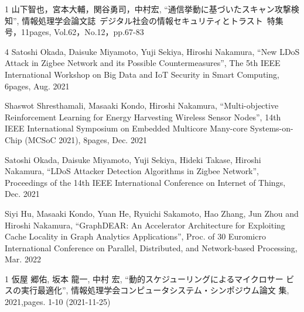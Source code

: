 \begin{雑誌論文}{1}
山下智也，宮本大輔，関谷勇司，中村宏, ``通信挙動に基づいたスキャン攻撃検
知'', 情報処理学会論文誌~デジタル社会の情報セキュリティとトラスト~特集
号，11pages, Vol.62，No.12，pp.67-83

\end{雑誌論文}

\begin{査読付}{4}
Satoshi Okada, Daisuke Miyamoto, Yuji Sekiya, Hiroshi Nakamura, ``New
LDoS Attack in Zigbee Network and its Possible Countermeasures'', The
5th IEEE International Workshop on Big Data and IoT Security in Smart
Computing, 6pages, Aug.  2021

Shaswot Shresthamali, Masaaki Kondo, Hiroshi Nakamura, ``Multi-objective
Reinforcement Learning for Energy Harvesting Wireless Sensor Nodes'',
14th IEEE International Symposium on Embedded Multicore Many-core
Systems-on-Chip (MCSoC 2021), 8pages, Dec. 2021

Satoshi Okada, Daisuke Miyamoto, Yuji Sekiya, Hideki Takase, Hiroshi
Nakamura, ``LDoS Attacker Detection Algorithms in Zigbee Network'',
Proceedings of the 14th IEEE International Conference on Internet of
Things, Dec. 2021

Siyi Hu, Masaaki Kondo, Yuan He, Ryuichi Sakamoto, Hao Zhang, Jun Zhou
and Hiroshi Nakamura, ``GraphDEAR: An Accelerator Architecture for
Exploiting Cache Locality in Graph Analytics Applications'', Proc. of 30
Euromicro International Conference on Parallel, Distributed, and
Network-based Processing, Mar. 2022

\end{査読付}

\begin{発表}{1}
仮屋 郷佑, 坂本 龍一, 中村 宏, ``動的スケジューリングによるマイクロサー
ビスの実行最適化'', 情報処理学会コンピュータシステム・シンポジウム論文
集, 2021,pages. 1-10 (2021-11-25)

\end{発表}
